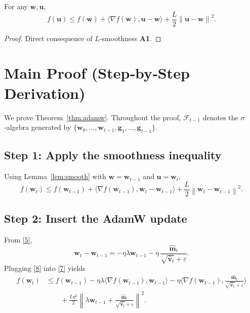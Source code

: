\documentclass{article}
\newcommand{\norm}[1]{\left\|#1\right\|}
\begin{document}
\begin{lemma}\label{lem:smooth}
For any $\bm w,\bm u$,
\[
    f(\bm u)\le f(\bm w)+\langle\nabla f(\bm w),\bm u-\bm w\rangle
    +\frac{L}{2}\norm{\bm u-\bm w}^{2}.
\tag{L2}
\]
\end{lemma}
\begin{proof}
Direct consequence of $L$‑smoothness \textbf{A1}. \qedhere
\end{proof}

\section*{Main Proof (Step‑by‑Step Derivation)}
We prove Theorem~\ref{thm:adamw}. Throughout the proof, $\mathcal{F}_{t-1}$ denotes the $\sigma$‑algebra generated by $\{\bm w_{0},\dots,\bm w_{t-1},\bm g_{1},\dots,\bm g_{t-1}\}$.

\subsection*{Step 1: Apply the smoothness inequality}
Using Lemma~\ref{lem:smooth} with $\bm w=\bm w_{t-1}$ and $\bm u=\bm w_{t}$,
\[
    f(\bm w_t)\le f(\bm w_{t-1})
    +\langle\nabla f(\bm w_{t-1}),\bm w_t-\bm w_{t-1}\rangle
    +\frac{L}{2}\norm{\bm w_t-\bm w_{t-1}}^{2}.
\tag{7}
\]

\subsection*{Step 2: Insert the AdamW update}
From \eqref{5},
\[
    \bm w_t-\bm w_{t-1}= -\eta\lambda\bm w_{t-1}
    -\eta\,\frac{\hat{\bm m}_{t}}{\sqrt{\hat{\bm v}_{t}}+\varepsilon}.
\tag{8}
\]
Plugging \eqref{8} into \eqref{7} yields
\begin{align}
    f(\bm w_t) &\le f(\bm w_{t-1})
    -\eta\lambda\langle\nabla f(\bm w_{t-1}),\bm w_{t-1}\rangle
    -\eta\Big\langle\nabla f(\bm w_{t-1}),
         \frac{\hat{\bm m}_{t}}{\sqrt{\hat{\bm v}_{t}}+\varepsilon}\Big\rangle \nonumber\\
    &\qquad +\frac{L\eta^{2}}{2}\norm{
        \lambda\bm w_{t-1}
        +\frac{\hat{\bm m}_{t}}{\sqrt{\hat{\bm v}_{t}}+\varepsilon}
    }^{2}. \tag{9}
\end{align}
\end{document}
